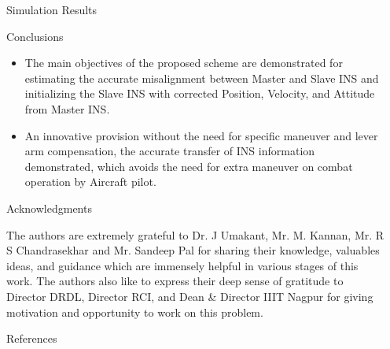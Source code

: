 \documentclass[final]{beamer}
\newlength{\sepwidth}
\newlength{\colwidth}
\newcommand{\separatorcolumn}{\begin{column}{\sepwidth}\end{column}}
\begin{document}
\begin{frame}[t]
\begin{columns}[t]
\begin{column}{\colwidth}
\begin{block}{Simulation Results}
  \end{block}
  

\begin{block}{Conclusions}
\begin{itemize}
    \item The main objectives   of   the   proposed   scheme   are demonstrated  for  estimating  the  accurate  misalignment between Master and Slave INS and initializing the Slave INS with corrected Position, Velocity, and Attitude from Master INS.
    \item An innovative provision without the need for specific maneuver and lever  arm  compensation,  the  accurate transfer  of  INS  information  demonstrated,  which  avoids the  need  for  extra  maneuver  on  combat  operation  by Aircraft pilot.
\end{itemize}

\end{block}
    \begin{block}{Acknowledgments}
    
The authors are extremely grateful to Dr. J Umakant, Mr. M. Kannan, Mr. R S Chandrasekhar and Mr. Sandeep Pal for sharing their knowledge, valuables ideas, and guidance which are immensely helpful in various stages of this work. The authors also like to express their deep sense of gratitude to Director DRDL, Director RCI, and Dean & Director IIIT Nagpur for giving motivation and opportunity to work on this problem.

\end{block}

\begin{block}{References}




\end{block}
\end{column}

\separatorcolumn
\end{columns}
\end{frame}
\end{document}
